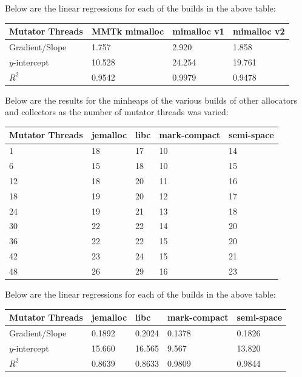 \documentclass{article}
\begin{document}
Below are the linear regressions for each of the builds in the above table:
\begin{center}
    \begin{tabular}{|l|l|l|l|}
        \hline
        Mutator Threads & MMTk mimalloc & mimalloc v1 & mimalloc v2\\
        \hline
        Gradient/Slope & 1.757 & 2.920 & 1.858\\
        \hline
        $y$-intercept & 10.528 & 24.254 & 19.761\\
        \hline
        $R^2$ & 0.9542 & 0.9979 & 0.9478\\
        \hline
    \end{tabular}
\end{center}

Below are the results for the minheaps of the various builds of other allocators and collectors as the number of mutator threads was varied:
\begin{center}
    \begin{tabular}{|l|l|l|l|l|}
        \hline
        Mutator Threads & jemalloc & libc & mark-compact & semi-space\\
        \hline
        1 & 18 & 17 & 10 & 14\\
        \hline
        6 & 15 & 18 & 10 & 15\\
        \hline
        12 & 18 & 20 & 11 & 16\\
        \hline
        18 & 19 & 20 & 12 & 17\\
        \hline
        24 & 19 & 21 & 13 & 18\\
        \hline
        30 & 22 & 22 & 14 & 20\\
        \hline
        36 & 22 & 22 & 15 & 20\\
        \hline
        42 & 23 & 24 & 15 & 21\\
        \hline
        48 & 26 & 29 & 16 & 23\\
        \hline
    \end{tabular}
\end{center}

Below are the linear regressions for each of the builds in the above table:
\begin{center}
    \begin{tabular}{|l|l|l|l|l|}
        \hline
        Mutator Threads & jemalloc & libc & mark-compact & semi-space\\
        \hline
        Gradient/Slope & 0.1892 & 0.2024 & 0.1378 & 0.1826\\
        \hline
        $y$-intercept & 15.660 & 16.565 & 9.567 & 13.820\\
        \hline
        $R^2$ & 0.8639 & 0.8633 & 0.9809 & 0.9844\\
        \hline
    \end{tabular}
\end{center}
\end{document}
